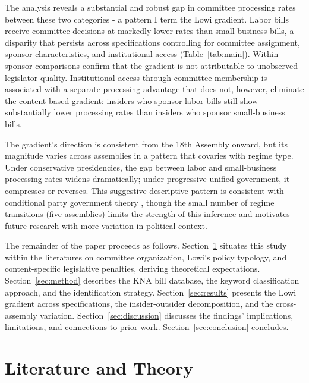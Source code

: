 \documentclass[11pt]{article}
\begin{document}
The analysis reveals a substantial and robust gap in committee processing rates between these two categories - a pattern I term the Lowi gradient. Labor bills receive committee decisions at markedly lower rates than small-business bills, a disparity that persists across specifications controlling for committee assignment, sponsor characteristics, and institutional access (Table~\ref{tab:main}). Within-sponsor comparisons confirm that the gradient is not attributable to unobserved legislator quality. Institutional access through committee membership is associated with a separate processing advantage that does not, however, eliminate the content-based gradient: insiders who sponsor labor bills still show substantially lower processing rates than insiders who sponsor small-business bills.

The gradient's direction is consistent from the 18th Assembly onward, but its magnitude varies across assemblies in a pattern that covaries with regime type. Under conservative presidencies, the gap between labor and small-business processing rates widens dramatically; under progressive unified government, it compresses or reverses. This suggestive descriptive pattern is consistent with conditional party government theory \citep{aldrich2001}, though the small number of regime transitions (five assemblies) limits the strength of this inference and motivates future research with more variation in political context.

The remainder of the paper proceeds as follows. Section~\ref{sec:lit} situates this study within the literatures on committee organization, Lowi's policy typology, and content-specific legislative penalties, deriving theoretical expectations. Section~\ref{sec:method} describes the KNA bill database, the keyword classification approach, and the identification strategy. Section~\ref{sec:results} presents the Lowi gradient across specifications, the insider-outsider decomposition, and the cross-assembly variation. Section~\ref{sec:discussion} discusses the findings' implications, limitations, and connections to prior work. Section~\ref{sec:conclusion} concludes.


\section{Literature and Theory}
\label{sec:lit}
\end{document}
